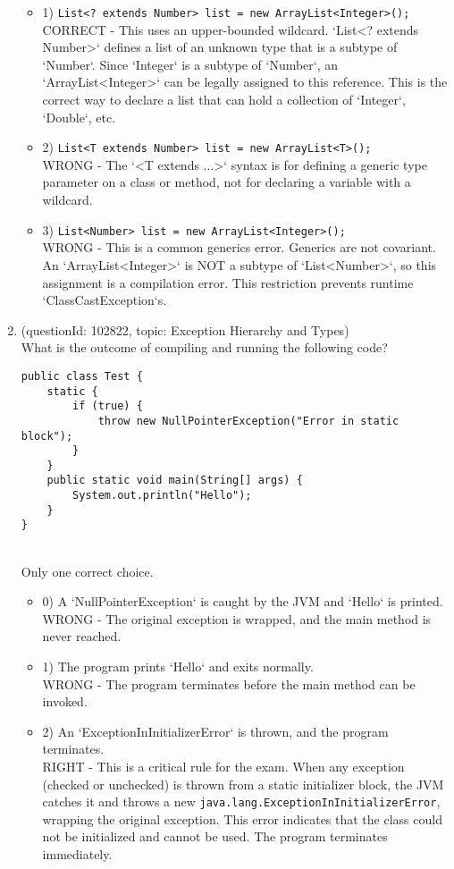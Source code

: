 \documentclass[12pt]{article}
\begin{document}
\begin{enumerate}[label=(\arabic*)]
\begin{itemize}
\item 1) \verb|List<? extends Number> list = new ArrayList<Integer>();|
 \\ 
CORRECT - This uses an upper-bounded wildcard. `List<? extends Number>` defines a list of an unknown type that is a subtype of `Number`. Since `Integer` is a subtype of `Number`, an `ArrayList<Integer>` can be legally assigned to this reference. This is the correct way to declare a list that can hold a collection of `Integer`, `Double`, etc.

\item 2) \verb|List<T extends Number> list = new ArrayList<T>();|
 \\ 
WRONG - The `<T extends ...>` syntax is for defining a generic type parameter on a class or method, not for declaring a variable with a wildcard.

\item 3) \verb|List<Number> list = new ArrayList<Integer>();|
 \\ 
WRONG - This is a common generics error. Generics are not covariant. An `ArrayList<Integer>` is NOT a subtype of `List<Number>`, so this assignment is a compilation error. This restriction prevents runtime `ClassCastException`s.

\end{itemize}
\item (questionId: 102822, topic: Exception Hierarchy and Types) \\ 
What is the outcome of compiling and running the following code?
\begin{verbatim}
public class Test {
    static {
        if (true) {
            throw new NullPointerException("Error in static block");
        }
    }
    public static void main(String[] args) {
        System.out.println("Hello");
    }
}
\end{verbatim}
\\ \noindent Only one correct choice. 
\begin{itemize}
\item 0) A `NullPointerException` is caught by the JVM and `Hello` is printed.
 \\ 
WRONG - The original exception is wrapped, and the main method is never reached.

\item 1) The program prints `Hello` and exits normally.
 \\ 
WRONG - The program terminates before the main method can be invoked.

\item 2) An `ExceptionInInitializerError` is thrown, and the program terminates.
 \\ 
RIGHT - This is a critical rule for the exam. When any exception (checked or unchecked) is thrown from a static initializer block, the JVM catches it and throws a new \verb|java.lang.ExceptionInInitializerError|, wrapping the original exception. This error indicates that the class could not be initialized and cannot be used. The program terminates immediately.


\end{itemize}
\end{enumerate}
\end{document}

